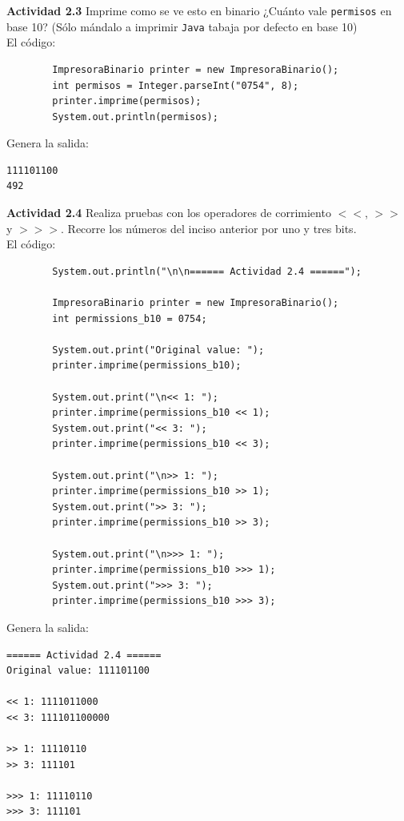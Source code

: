 \documentclass[11pt,letterpaper]{article}
\begin{document}
\textbf{Actividad 2.3} Imprime como se ve esto en binario ¿Cuánto vale \texttt{permisos}
en base 10? (Sólo mándalo a imprimir \texttt{Java} tabaja por defecto en base 10) \\

    El código:

    \begin{verbatim}
        ImpresoraBinario printer = new ImpresoraBinario();
        int permisos = Integer.parseInt("0754", 8);
        printer.imprime(permisos);
        System.out.println(permisos);
    \end{verbatim}

    Genera la salida:
    \begin{verbatim}
111101100
492
    \end{verbatim}

\textbf{Actividad 2.4} Realiza pruebas con los operadores de corrimiento $<<$, $>>$ y $>>>$.
Recorre los números del inciso anterior por uno y tres bits. \\

    El código:

    \begin{verbatim}
        System.out.println("\n\n====== Actividad 2.4 ======");

        ImpresoraBinario printer = new ImpresoraBinario();
        int permissions_b10 = 0754;

        System.out.print("Original value: ");
        printer.imprime(permissions_b10);

        System.out.print("\n<< 1: ");
        printer.imprime(permissions_b10 << 1);
        System.out.print("<< 3: ");
        printer.imprime(permissions_b10 << 3);

        System.out.print("\n>> 1: ");
        printer.imprime(permissions_b10 >> 1);
        System.out.print(">> 3: ");
        printer.imprime(permissions_b10 >> 3);

        System.out.print("\n>>> 1: ");
        printer.imprime(permissions_b10 >>> 1);
        System.out.print(">>> 3: ");
        printer.imprime(permissions_b10 >>> 3);
    \end{verbatim}

    Genera la salida:
    \begin{verbatim}
====== Actividad 2.4 ======
Original value: 111101100

<< 1: 1111011000
<< 3: 111101100000

>> 1: 11110110
>> 3: 111101

>>> 1: 11110110
>>> 3: 111101
    \end{verbatim}
\end{document}
